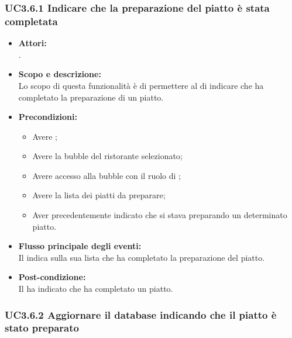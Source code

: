\subsubsection{UC3.6.1 Indicare che la preparazione del piatto è stata completata} \label{UC3.6.1}

\begin{itemize}
	\item \textbf{Attori:}
	\\.
	\item \textbf{Scopo e descrizione:} 
	\\Lo scopo di questa funzionalità è di permettere al  di indicare che ha completato la preparazione di un piatto.
	\item \textbf{Precondizioni:}
	\begin{itemize}
		\item Avere ;
		\item Avere la bubble del ristorante selezionato;
		\item Avere accesso alla bubble con il ruolo di ;
		\item Avere la lista dei piatti da preparare;
		\item Aver precedentemente indicato che si stava preparando un determinato piatto.
	\end{itemize}
	\item \textbf{Flusso principale degli eventi:}
	\\Il {} indica sulla sua lista che ha completato la preparazione del piatto.
	\item \textbf{Post-condizione:}
	\\Il {} ha indicato che ha completato un piatto.
\end{itemize}

\subsubsection{UC3.6.2 Aggiornare il database indicando che il piatto è stato preparato} \label{UC3.6.2}

